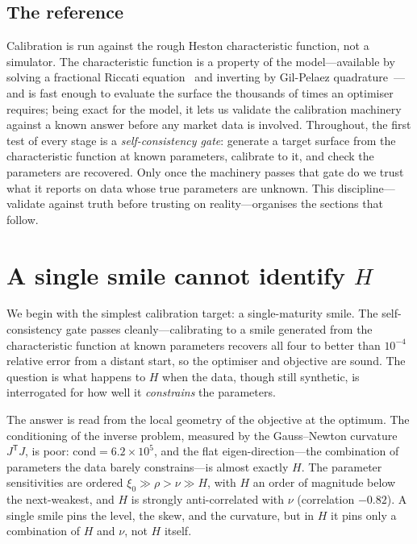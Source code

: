 \documentclass[11pt,a4paper]{article}
\numberwithin{equation}{section}
\begin{document}
\subsection{The reference}

Calibration is run against the rough Heston characteristic function, not a simulator. The
characteristic function is a property of the model---available by solving a fractional Riccati
equation~\citep{eer2019} and inverting by Gil-Pelaez quadrature~\citep{gilpelaez1951}---and is
fast enough to evaluate the surface the thousands of times an optimiser requires; being exact for
the model, it lets us validate
the calibration machinery against a known answer before any market data is involved. Throughout,
the first test of every stage is a \emph{self-consistency gate}: generate a target surface from
the characteristic function at known parameters, calibrate to it, and check the parameters are
recovered. Only once the machinery passes that gate do we trust what it reports on data whose
true parameters are unknown. This discipline---validate against truth before trusting on
reality---organises the sections that follow.

\section{A single smile cannot identify \texorpdfstring{$H$}{H}}\label{sec:single}

We begin with the simplest calibration target: a single-maturity smile. The self-consistency
gate passes cleanly---calibrating to a smile generated from the characteristic function at known
parameters recovers all four to better than $10^{-4}$ relative error from a distant start, so the
optimiser and objective are sound. The question is what happens to $H$ when the data, though still
synthetic, is interrogated for how well it \emph{constrains} the parameters.

The answer is read from the local geometry of the objective at the optimum. The conditioning of
the inverse problem, measured by the Gauss--Newton curvature $J^{\mathsf T}J$, is poor:
$\mathrm{cond}=6.2\times 10^{5}$, and the flat eigen-direction---the combination of parameters
the data barely constrains---is almost exactly $H$. The parameter sensitivities are ordered
$\xi_0 \gg \rho > \nu \gg H$, with $H$ an order of magnitude below the next-weakest, and $H$ is
strongly anti-correlated with $\nu$ (correlation $-0.82$). A single smile pins the level, the
skew, and the curvature, but in $H$ it pins only a combination of $H$ and $\nu$, not $H$ itself.
\end{document}
